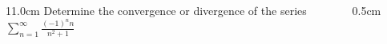 \begin{frame}
\frametitle{}
\scriptsize

\vspace{0.2cm}

\begin{columns}
\begin{column}{11.0cm}
Determine the convergence or divergence of the series \\
\vspace{0.2cm}
$\displaystyle{\sum \limits_{n=1}^{\infty} \frac{(-1)^{n}n}{n^2 + 1}}$ \\

\vspace{10.5cm}

\end{column}
\begin{column}{0.5cm}
	
\end{column}
\end{columns}
\end{frame}

